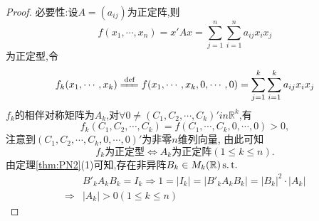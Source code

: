 \begin{proof}
  必要性:设$A=(a_{ij})$为正定阵,则
  \[ f(x_1,\cdots,x_n)=x'Ax=\sum_{j=1}^n\sum_{i=1}^na_{ij}x_ix_j \]
  为正定型,令
  \[ f_k(x_1,\cdots,x_k) \xlongequal {\text{def}} f(x_1,\cdots,x_k,0,\cdots,0)
    = \sum_{j=1}^k\sum_{i=1}^ka_{ij}x_ix_j
  \]
  $f_k$的相伴对称矩阵为$A_k$,对$\forall 0 \neq (C_1,C_2,\cdots,C_k)' in \mathbb{R}^k$,有
  \[ f_k(C_1,C_2,\cdots,C_k)=f(C_1,\cdots,C_k,0,\cdots,0) > 0, \]
  注意到$(C_1,C_2,\cdots,C_k,0,\cdots,0)'$为非零$n$维列向量,
  由此可知
  \[f_k\text{为正定型} \Longleftrightarrow A_k\text{为正定阵}(1\leq k \leq n).\]
  由定理\ref{thm:PN2}(1)可知,存在非异阵$B_k \in M_k(\mathbb{R}) \operatorname{{}s.t.{}}$
  \begin{align*}
    & B'_kA_kB_k=I_k \Longrightarrow 1 = |I_k|=|B'_kA_kB_k|=|B_k|^2\cdot|A_k|\\
    \Longrightarrow & |A_k| > 0 (1 \leq k \leq n)
  \end{align*}


\end{proof}
